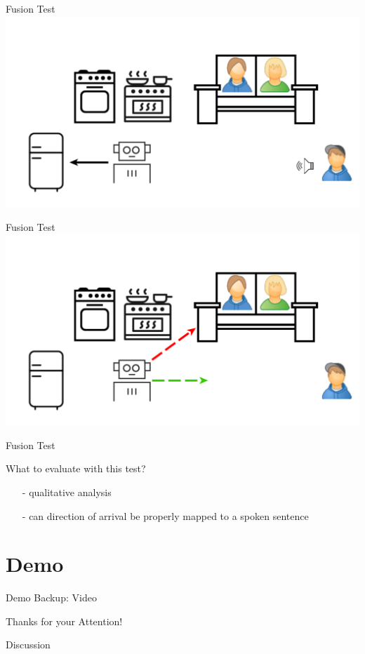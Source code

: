 \documentclass{beamer}
\begin{document}
	\begin{frame}{Fusion Test}
		\centering
		\includegraphics[width=.75\textwidth]{Bilder/fusion_test_1}
	\end{frame}
	
	\begin{frame}{Fusion Test}
		\centering
		\includegraphics[width=.75\textwidth]{Bilder/fusion_test_2}
	\end{frame}
	
	\begin{frame}{Fusion Test}
		\begin{alertblock}{What to evaluate with this test?}
			\pause
			\begin{itemize}
				\item[-] qualitative analysis
				\item[-] can direction of arrival be properly mapped to a spoken sentence
			\end{itemize}
		\end{alertblock}
	\end{frame}
	
	
	
	
	
	\section{Demo}
	
	\begin{frame}{Demo Backup: Video}
	\end{frame}
	
	
	
	\begin{frame}{}
		\begin{alertblock}{Thanks for your Attention!}
		\end{alertblock}
	\end{frame}
	
	\begin{frame}{}
		\begin{alertblock}{Discussion}
		\end{alertblock}
	\end{frame}
	
\end{document}
